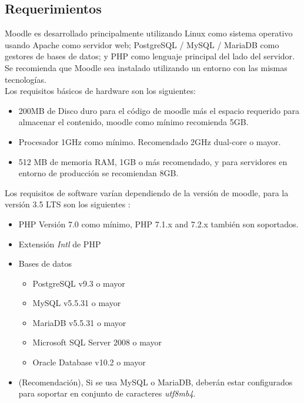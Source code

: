 
\begin{quote}

\end{quote}

\subsection{Requerimientos}

Moodle es desarrollado principalmente utilizando Linux como sistema operativo usando Apache como servidor web; PostgreSQL / MySQL / MariaDB como gestores de bases de datos; y PHP como lenguaje principal del lado del servidor. Se recomienda que Moodle sea instalado utilizando un entorno con las mismas tecnologías. \cite{moodleInstall} \\

\noindent Los requisitos básicos de hardware son los siguientes:

    \begin{itemize}
        \item 200MB de Disco duro para el código de moodle más el espacio requerido para almacenar el contenido, moodle como mínimo recomienda 5GB.
        \item Procesador 1GHz como mínimo. Recomendado 2GHz dual-core o mayor.
        \item 512 MB de memoria RAM, 1GB o más recomendado, y para servidores en entorno de producción se recomiendan 8GB.
    \end{itemize}
\clearpage    
\noindent Los requisitos de software varían dependiendo de la versión de moodle, para la versión 3.5 LTS son los siguientes \cite{moodleReleaseNotes}:
    
    \begin{itemize}
        \item PHP Versión 7.0 como mínimo, PHP 7.1.x and 7.2.x también son soportados.
        \item Extensión {\it Intl} de PHP
        \item Bases de datos
            \begin{itemize}
                \item PostgreSQL v9.3 o mayor
                \item MySQL v5.5.31 o mayor
                \item MariaDB v5.5.31 o mayor
                \item Microsoft SQL Server 2008 o mayor
                \item Oracle Database v10.2 o mayor
            \end{itemize}
        \item[] (Recomendación), Si se usa MySQL o MariaDB, deberán estar configurados para soportar en conjunto de caracteres {\it utf8mb4}.
    \end{itemize}
    
